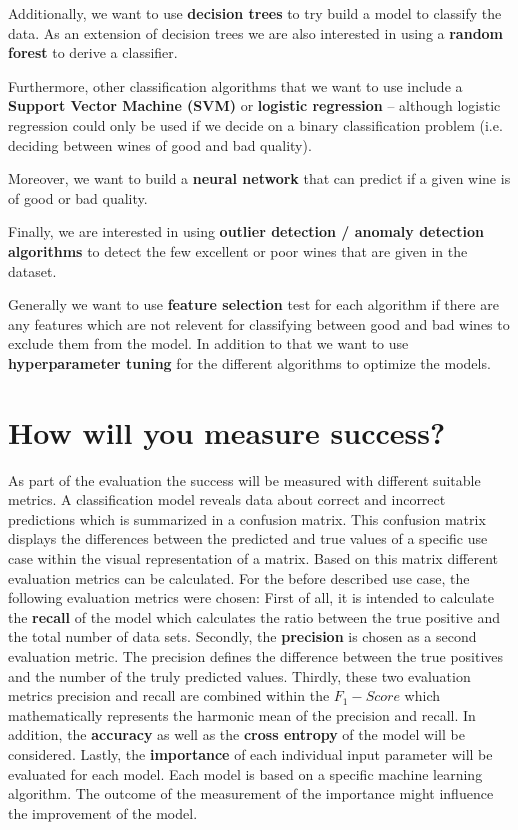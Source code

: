 \documentclass[11pt,titlepage,oneside,openany]{article}
\begin{document}
Additionally, we want to use \textbf{decision trees} to try build a model to classify the
data. As an extension of decision trees we are also interested in using a \textbf{random forest}
to derive a classifier.

Furthermore, other classification algorithms that we want to use include a \textbf{Support Vector Machine (SVM)}
or \textbf{logistic regression} -- although logistic regression could only be used if we decide on
a binary classification problem (i.e. deciding between wines of good and bad quality).

Moreover, we want to build a \textbf{neural network} that can predict if a given wine is of good or bad quality.

Finally, we are interested in using \textbf{outlier detection / anomaly detection algorithms} to detect the few 
excellent or poor wines that are given in the dataset.

Generally we want to use \textbf{feature selection} test for each algorithm if there are any features which are not relevent 
for classifying between good and bad wines to exclude them from the model. In addition to that we want to use 
\textbf{hyperparameter tuning} for the different algorithms to optimize the models.

\section{How will you measure success?}
As part of the evaluation the success will be measured with different suitable metrics. A classification model reveals data about correct and incorrect predictions which is summarized in a confusion matrix. This confusion matrix displays the differences between the predicted and true values of a specific use case within the visual representation of a matrix. Based on this matrix different evaluation metrics can be calculated. For the before described use case, the following evaluation metrics were chosen:
First of all, it is intended to calculate the \textbf{recall} of the model which calculates the ratio between the true positive and the total number of data sets. Secondly, the \textbf{precision} is chosen as a second evaluation metric. The precision defines the difference between the true positives and the number of the truly predicted values. Thirdly, these two evaluation metrics precision and recall are combined within the \textbf{$F_1-Score$} which mathematically represents the harmonic mean of the precision and recall. In addition, the \textbf{accuracy} as well as the \textbf{cross entropy} of the model will be considered. Lastly, the \textbf{importance} of each individual input parameter will be evaluated for each model. Each model is based on a specific machine learning algorithm. The outcome of the measurement of the importance might influence the improvement of the model.
\end{document}
